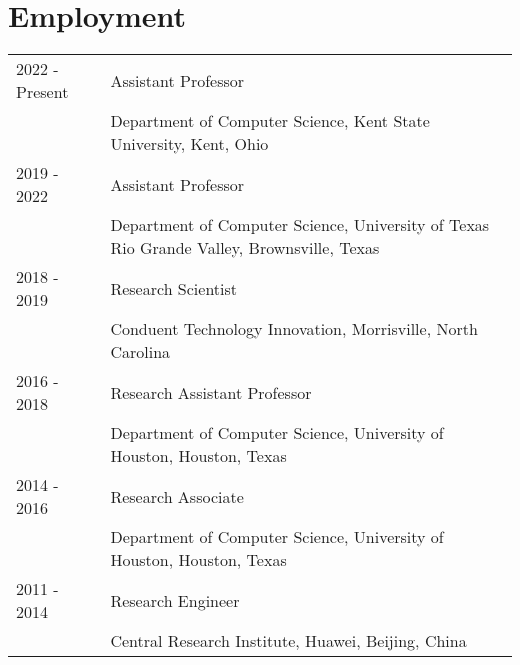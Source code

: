 
\section*{Employment}
\begin{longtable}{p{1in}p{5in}}

    2022 - Present  &   Assistant Professor\\
                    &   Department of Computer Science, Kent State University, Kent, Ohio\\

    2019 - 2022	    &	Assistant Professor\\
                    &   Department of Computer Science, University of Texas Rio Grande Valley, Brownsville, Texas\\ 

    2018 - 2019		&   Research Scientist\\
                    &   Conduent Technology Innovation, Morrisville, North Carolina\\

    2016 - 2018		&   Research Assistant Professor\\
                    &   Department of Computer Science, University of Houston, Houston, Texas\\

    2014 - 2016		&   Research Associate\\
                    &   Department of Computer Science, University of Houston, Houston, Texas\\

    2011 - 2014		&   Research Engineer\\
                    &   Central Research Institute, Huawei, Beijing, China\\
\end{longtable}
